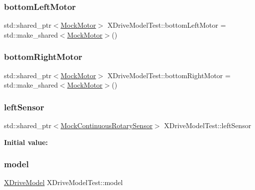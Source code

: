 \subsubsection{\texorpdfstring{bottomLeftMotor}{bottomLeftMotor}}
{\footnotesize\ttfamily std\+::shared\+\_\+ptr$<$\mbox{\hyperlink{classokapi_1_1MockMotor}{Mock\+Motor}}$>$ X\+Drive\+Model\+Test\+::bottom\+Left\+Motor = std\+::make\+\_\+shared$<$\mbox{\hyperlink{classokapi_1_1MockMotor}{Mock\+Motor}}$>$()}

\mbox{\label{classXDriveModelTest_abc9ede36f43071f8ce33e5f4f48eadaf}} 
\subsubsection{\texorpdfstring{bottomRightMotor}{bottomRightMotor}}
{\footnotesize\ttfamily std\+::shared\+\_\+ptr$<$\mbox{\hyperlink{classokapi_1_1MockMotor}{Mock\+Motor}}$>$ X\+Drive\+Model\+Test\+::bottom\+Right\+Motor = std\+::make\+\_\+shared$<$\mbox{\hyperlink{classokapi_1_1MockMotor}{Mock\+Motor}}$>$()}

\mbox{\label{classXDriveModelTest_aa7f4b9d84586f5d7f61a4539ac68b2c3}} 
\subsubsection{\texorpdfstring{leftSensor}{leftSensor}}
{\footnotesize\ttfamily std\+::shared\+\_\+ptr$<$\mbox{\hyperlink{classokapi_1_1MockContinuousRotarySensor}{Mock\+Continuous\+Rotary\+Sensor}}$>$ X\+Drive\+Model\+Test\+::left\+Sensor}

{\bfseries Initial value\+:}
\begin{DoxyCode}{0}
\DoxyCodeLine{=}

\end{DoxyCode}
\mbox{\label{classXDriveModelTest_afb6c8fd3f9a6b03c3c1de42e5c9ff567}} 
\subsubsection{\texorpdfstring{model}{model}}
{\footnotesize\ttfamily \mbox{\hyperlink{classokapi_1_1XDriveModel}{X\+Drive\+Model}} X\+Drive\+Model\+Test\+::model}

